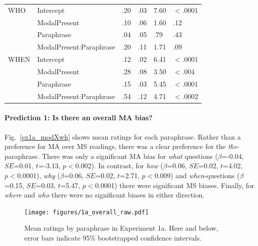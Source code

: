 \documentclass[12pt,letterpaper,table,svgnames,dvipsnames]{article}
\newcommand{\jd}[1]{\textcolor{Purple}{[jd: #1]}}
\newcommand{\figref}[1]{Fig.~\ref{#1}}
\begin{document}
\begin{table}[p!]
\begin{center}
\begin{tabular}{llllll}
\midrule
WHO & Intercept & .20 & .03 & 7.60 & $<$.0001\\
{} & ModalPresent & .10 & .06 & 1.60 & .12\\
{} & Paraphrase & .04 & .05 & .79 & .43\\
{} & ModalPresent:Paraphrase & .20 & .11 & 1.71 & .09\\
\midrule
WHEN & Intercept & .12 & .02 & 6.41 & $<$.0001\\
{} & ModalPresent & .28 & .08 & 3.50 & $<$.004\\
{} & Paraphrase & .15 & .03 & 5.45 & $<$.0001\\
{} & ModalPresent:Paraphrase & .54 & .12 & 4.71 & $<$.0002\\
\bottomrule
\end{tabular} 
\end{center} 
\end{table}






\paragraph{Prediction 1: Is there an overall MA bias?} 
\figref{ex1a_modXwh} shows mean ratings for each paraphrase. Rather than a preference for MA over MS readings, there was a clear preference for the \emph{the}-paraphrase. There was only a significant MA bias %
for \emph{what} questions ($\beta$=-0.04, $SE$=0.01, $t$=-3.13, $p<$0.002). In contrast, for \emph{how} ($\beta$=0.06, $SE$=0.02, $t$=4.02, $p<$0.0001), \emph{why} ($\beta$=0.06, $SE$=0.02, $t$=2.71, $p<$0.009) and \emph{when}-questions ($\beta$=0.15, $SE$=0.03, $t$=5.47, $p<$0.0001) there were significant MS biases. Finally, for \emph{where} and \emph{who} there were no significant biases in either direction. 


\begin{figure}[h!]
\centering
\texttt{[image: figures/1a\_overall\_raw.pdf]}
\caption{Mean ratings by paraphrase in Experiment 1a. Here and below, error bars indicate 95\% bootstrapped confidence intervals. }
\label{ex1a_overall}
\end{figure}
\end{document}
